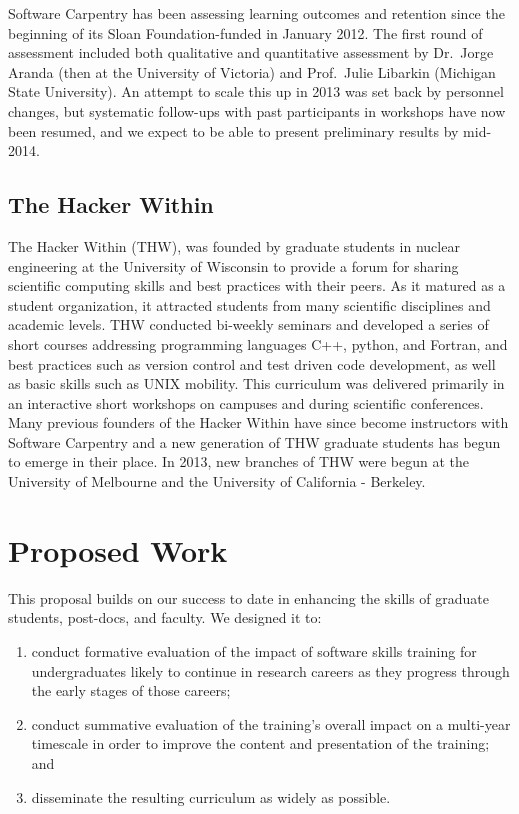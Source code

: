 \documentclass[11pt]{article}
\begin{document}
Software Carpentry has been assessing learning outcomes and retention
since the beginning of its Sloan Foundation-funded in January 2012.
The first round of assessment included both qualitative and
quantitative assessment by Dr.\ Jorge Aranda (then at the University
of Victoria) and Prof.\ Julie Libarkin (Michigan State University).
An attempt to scale this up in 2013 was set back by personnel changes,
but systematic follow-ups with past participants in workshops have now
been resumed, and we expect to be able to present preliminary results
by mid-2014.

\subsection{The Hacker Within}

The Hacker Within (THW)\cite{huff2011}, was founded by graduate students in 
nuclear engineering at the University of Wisconsin to provide a forum for 
sharing scientific computing skills and best practices with their peers. As it 
matured as a student organization, it attracted students from many scientific 
disciplines and academic levels. THW conducted bi-weekly seminars and developed 
a series of short courses addressing programming languages C++, python, and 
Fortran, and best practices such as version control and test driven code 
development, as well as basic skills such as UNIX mobility. This curriculum was 
delivered primarily in an interactive short workshops on campuses and during 
scientific conferences. Many previous founders of the Hacker Within have since 
become instructors with Software Carpentry and a new generation of THW graduate 
students has begun to emerge in their place. In 2013, new branches of THW were 
begun at the University of Melbourne and the University of California - 
Berkeley.  

\section{Proposed Work}

This proposal builds on our success to date in enhancing the skills of
graduate students, post-docs, and faculty.  We designed it to:

\begin{enumerate}

\item
  conduct formative evaluation of the impact of software skills
  training for undergraduates likely to continue in research careers
  as they progress through the early stages of those careers;

\item
  conduct summative evaluation of the training's overall impact on a
  multi-year timescale in order to improve the content and
  presentation of the training; and

\item
  disseminate the resulting curriculum as widely as possible.

\end{enumerate}
\end{document}
